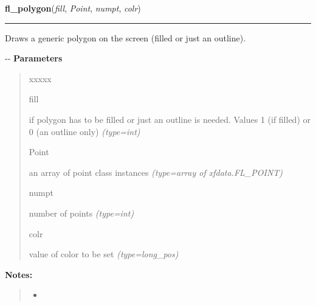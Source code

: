    \label{xformslib:flxbasic:fl_polygon}

    \vspace{0.5ex}

\hspace{.8\funcindent}\begin{boxedminipage}{\funcwidth}

    \raggedright \textbf{fl\_polygon}(\textit{fill}, \textit{Point}, \textit{numpt}, \textit{colr})

    \vspace{-1.5ex}

    \rule{\textwidth}{0.5\fboxrule}
\setlength{\parskip}{2ex}

Draws a generic polygon on the screen (filled or just an outline).

-{}-
\setlength{\parskip}{1ex}
      \textbf{Parameters}
      \vspace{-1ex}

      \begin{quote}
        \begin{Ventry}{xxxxx}

          \item[fill]


if polygon has to be filled or just an outline is needed. Values 1
(if filled) or 0 (an outline only)
            {\it (type=int)}

          \item[Point]


an array of point class instances
            {\it (type=array of xfdata.FL\_POINT)}

          \item[numpt]


number of points
            {\it (type=int)}

          \item[colr]


value of color to be set
            {\it (type=long\_pos)}

        \end{Ventry}

      \end{quote}

\textbf{Notes:}
\begin{quote}
  \begin{itemize}

  \item
    \setlength{\parskip}{0.6ex}


\end{itemize}
\end{quote}
\end{boxedminipage}
